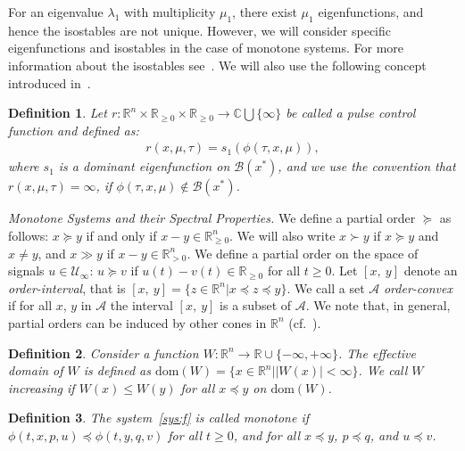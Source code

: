 \documentclass[letterpaper, 10pt, journal]{IEEEtran}  %
\newcommand{\R}{{\mathbb R}}
\newcommand{\Rnn}{{\mathbb R}_{\ge 0}}
\newcommand{\Rp}{{\mathbb R}_{> 0}}
\newcommand{\C}{{\mathbb C}}
\newcommand{\cA}{{\mathcal A}}
\newcommand{\cB}{{\mathcal B}}
\newcommand{\cU}{{\mathcal U}}
\newcommand{\dom}{\mathrm{dom}}
\newtheorem{defn}{Definition}
\begin{document}
For an eigenvalue $\lambda_1$ with multiplicity $\mu_1$, there exist $\mu_1$ eigenfunctions, and hence the isostables are not unique. However, we will consider specific eigenfunctions and isostables in the case of monotone systems. For more information about the isostables see~\cite{mauroy2013isostables}. We will also use the following concept introduced in~\cite{sootla2016optimalswitching}.

\begin{defn} \label{def:control-smth-function} 
	Let $r:\R^n\times \Rnn\times \Rnn \rightarrow \C\bigcup\{\infty\}$ be called a \emph{pulse control function} and defined as:
	\begin{gather*}
	r(x, \mu,\tau) = s_1(\phi(\tau, x, \mu)), 
	\end{gather*}
	where $s_1$ is a dominant eigenfunction on $\cB(x^\ast)$, and we use the convention that $r(x, \mu, \tau) = \infty$, if $\phi(\tau, x, \mu) \not \in \cB(x^\ast)$.	
\end{defn}

\emph{Monotone Systems and their Spectral Properties.} We define a partial order $\succeq$ as follows: $x\succeq y$ if and only if $ x - y \in \Rnn^n$.  We will also write $x\succ y$ if $x\succeq y$ and $x\ne y$, and $x\gg y$ if $x- y \in \Rp^n$. We define a partial order on the space of signals $u\in \cU_{\infty}$: $u\succeq v$ if $u(t) - v(t) \in \Rnn$ for all $t\ge 0$. Let $[x,~y]$ denote an \emph{order-interval}, that is $[x,~y] = \{ z\in\R^n | x\preceq  z \preceq y \}$. We call a set $\cA$ \emph{order-convex} if for all $x$, $y$ in $\cA$ the interval $[x,~y]$ is a subset of $\cA$. We note that, in general, partial orders can be induced by other cones in $\R^n$ (cf.~\cite{smith2008monotone}).

\begin{defn} Consider a function $W:\R^n \rightarrow \R\cup \{-\infty, +\infty\}$.
	 The effective domain of $W$ is defined as $\dom(W) = \{x \in\R^n | |W(x)| < \infty  \}$. We call $W$ \emph{increasing}  if $W(x) \le W(y)$ for all $x\preceq y$ on $\dom(W)$. 
\end{defn}
\begin{defn}\label{def:mon}
The system~\eqref{sys:f} is called \emph{monotone} if $\phi(t,x, p, u)\preceq \phi(t,y, q, v)$ for all $t\ge 0$, and for all $x\preceq y$, $p\preceq q$, and $u\preceq v$. 
\end{defn}
\end{document}
